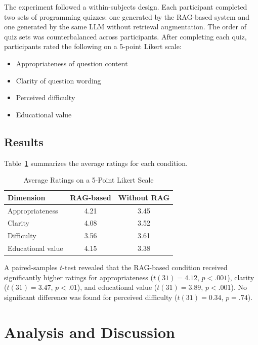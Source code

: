 \documentclass[11pt,a4paper]{article}
\begin{document}
The experiment followed a within-subjects design. Each participant completed two sets of programming quizzes: one generated by the RAG-based system and one generated by the same LLM without retrieval augmentation. The order of quiz sets was counterbalanced across participants. After completing each quiz, participants rated the following on a 5-point Likert scale:

\begin{itemize}
  \item Appropriateness of question content
  \item Clarity of question wording
  \item Perceived difficulty
  \item Educational value
\end{itemize}

\subsection{Results}

Table~\ref{tab:ratings} summarizes the average ratings for each condition.

\begin{table}[htbp]
  \centering
  \caption{Average Ratings on a 5-Point Likert Scale}
  \label{tab:ratings}
  \begin{tabular}{lcc}
    \toprule
    Dimension & RAG-based & Without RAG \\
    \midrule
    Appropriateness & 4.21 & 3.45 \\
    Clarity         & 4.08 & 3.52 \\
    Difficulty      & 3.56 & 3.61 \\
    Educational value & 4.15 & 3.38 \\
    \bottomrule
  \end{tabular}
\end{table}

A paired-samples $t$-test revealed that the RAG-based condition received significantly higher ratings for appropriateness ($t(31) = 4.12$, $p < .001$), clarity ($t(31) = 3.47$, $p < .01$), and educational value ($t(31) = 3.89$, $p < .001$). No significant difference was found for perceived difficulty ($t(31) = 0.34$, $p = .74$).


\section{Analysis and Discussion}
\end{document}
